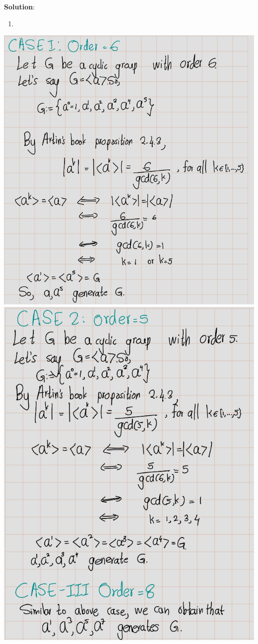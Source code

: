 \documentclass[
]{book}
\providecommand{\tightlist}{%
  \setlength{\itemsep}{0pt}\setlength{\parskip}{0pt}}
\theoremstyle{definition}
\theoremstyle{definition}
\theoremstyle{definition}
\theoremstyle{definition}
\theoremstyle{remark}
\begin{document}
\textbf{Solution}:

\begin{enumerate}
\def\labelenumi{\alph{enumi})}
\tightlist
\item
\end{enumerate}

\includegraphics{figures/ch_2/fig61.png}
\includegraphics{figures/ch_2/fig62.png}
\end{document}
